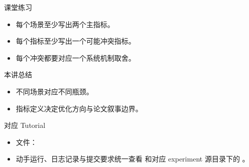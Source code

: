 \begin{frame}{课堂练习}
  \begin{itemize}
    \item 每个场景至少写出两个主指标。
    \item 每个指标至少写出一个可能冲突指标。
    \item 每个冲突都要对应一个系统机制取舍。
  \end{itemize}
\end{frame}

\begin{frame}{本讲总结}
  \begin{itemize}
    \item 不同场景对应不同瓶颈。
    \item 指标定义决定优化方向与论文叙事边界。
  \end{itemize}
\end{frame}

\begin{frame}{对应 Tutorial}
  \begin{itemize}
    \item 文件：\texttt{}
    \item 动手运行、日志记录与提交要求统一查看 \texttt{} 和对应 experiment 源目录下的 \texttt{}。
  \end{itemize}
\end{frame}

